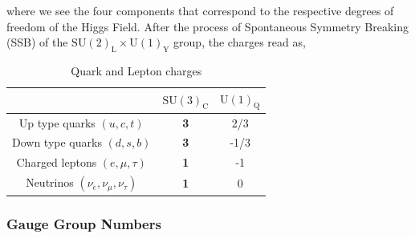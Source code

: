 \documentclass[10pt]{book}
\newcommand{\U}[1]{\mathrm{U}(1)_{\mathrm{#1}}}
\renewcommand{\(}{\left(}
\renewcommand{\)}{\right)}
\renewcommand{\[}{\left[}
\renewcommand{\]}{\right]}
\begin{document}
%
%
where we see the four components that correspond to the respective degrees of freedom of the Higgs Field.
% 
After the process of Spontaneous Symmetry Breaking (SSB) of the $\mathrm{SU(2)_L} \times \U{Y}$ group, the charges read as,
%
\begin{table}[H]
\caption{Quark and Lepton charges}
\centering
\begin{tabular}{ccc}
  \hline & $\mathrm{SU(3)_C}$ & $\mathrm{U(1)_Q}$ \\
  \hline 
Up type quarks $(u,c,t)$ & \textbf{3} & 2/3 \\
Down type quarks $(d,s,b)$ & \textbf{3} & -1/3 \\
Charged leptons $(e,\mu,\tau)$ & \textbf{1} & -1 \\
Neutrinos  $(\nu_e,\nu_\mu,\nu_\tau)$  & \textbf{1} & 0 \\
  \hline	
\end{tabular}
\end{table}


\subsubsection{Gauge Group Numbers}
\end{document}

